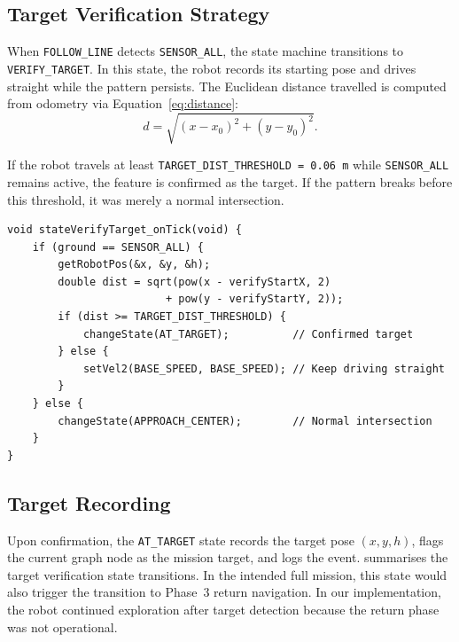 \documentclass[runningheads]{llncs}
\begin{document}
\subsection{Target Verification Strategy}

When \texttt{FOLLOW\_LINE} detects \texttt{SENSOR\_ALL}, the state machine transitions to \texttt{VERIFY\_TARGET}. In this state, the robot records its starting pose and drives straight while the pattern persists. The Euclidean distance travelled is computed from odometry via Equation~\eqref{eq:distance}:
\begin{equation}
    d = \sqrt{(x - x_0)^2 + (y - y_0)^2}.
    \label{eq:distance}
\end{equation}

If the robot travels at least \texttt{TARGET\_DIST\_THRESHOLD = 0.06\,m} while \texttt{SENSOR\_ALL} remains active, the feature is confirmed as the target. If the pattern breaks before this threshold, it was merely a normal intersection.

\begin{lstlisting}[caption={Target verification logic in \texttt{VERIFY\_TARGET}.},label={lst:verifytarget}]
void stateVerifyTarget_onTick(void) {
    if (ground == SENSOR_ALL) {
        getRobotPos(&x, &y, &h);
        double dist = sqrt(pow(x - verifyStartX, 2)
                         + pow(y - verifyStartY, 2));
        if (dist >= TARGET_DIST_THRESHOLD) {
            changeState(AT_TARGET);          // Confirmed target
        } else {
            setVel2(BASE_SPEED, BASE_SPEED); // Keep driving straight
        }
    } else {
        changeState(APPROACH_CENTER);        // Normal intersection
    }
}
\end{lstlisting}

\subsection{Target Recording}

Upon confirmation, the \texttt{AT\_TARGET} state records the target pose $(x, y, h)$, flags the current graph node as the mission target, and logs the event.  summarises the target verification state transitions. In the intended full mission, this state would also trigger the transition to Phase~3 return navigation. In our implementation, the robot continued exploration after target detection because the return phase was not operational.
\end{document}
